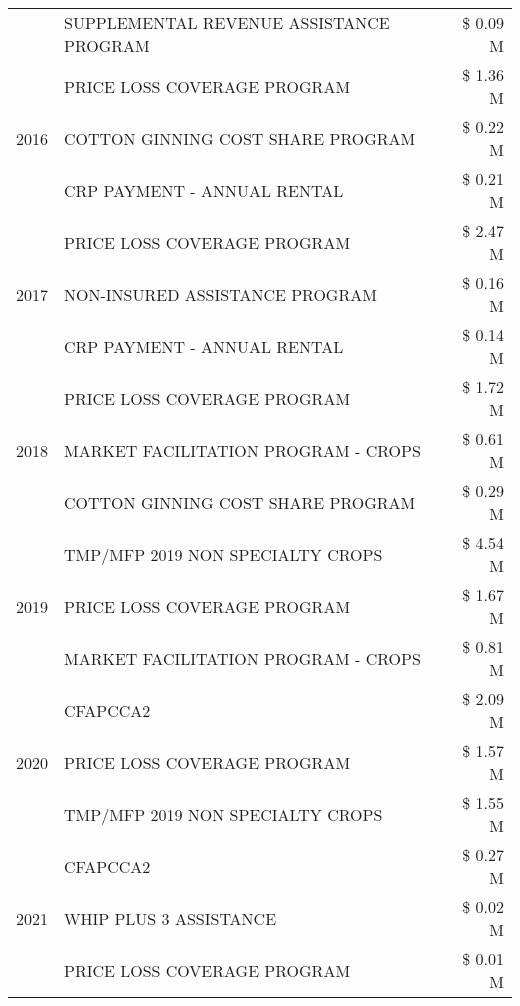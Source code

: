 \begin{tabular}{llr}
 & SUPPLEMENTAL REVENUE ASSISTANCE PROGRAM & \$ 0.09 M \\
\cline{1-3}
\multirow[t]{3}{*}{2016} & PRICE LOSS COVERAGE PROGRAM & \$ 1.36 M \\
 & COTTON GINNING COST SHARE PROGRAM & \$ 0.22 M \\
 & CRP PAYMENT - ANNUAL RENTAL & \$ 0.21 M \\
\cline{1-3}
\multirow[t]{3}{*}{2017} & PRICE LOSS COVERAGE PROGRAM & \$ 2.47 M \\
 & NON-INSURED ASSISTANCE PROGRAM & \$ 0.16 M \\
 & CRP PAYMENT - ANNUAL RENTAL & \$ 0.14 M \\
\cline{1-3}
\multirow[t]{3}{*}{2018} & PRICE LOSS COVERAGE PROGRAM & \$ 1.72 M \\
 & MARKET FACILITATION PROGRAM - CROPS & \$ 0.61 M \\
 & COTTON GINNING COST SHARE PROGRAM & \$ 0.29 M \\
\cline{1-3}
\multirow[t]{3}{*}{2019} & TMP/MFP 2019 NON SPECIALTY CROPS & \$ 4.54 M \\
 & PRICE LOSS COVERAGE PROGRAM & \$ 1.67 M \\
 & MARKET FACILITATION PROGRAM - CROPS & \$ 0.81 M \\
\cline{1-3}
\multirow[t]{3}{*}{2020} & CFAPCCA2 & \$ 2.09 M \\
 & PRICE LOSS COVERAGE PROGRAM & \$ 1.57 M \\
 & TMP/MFP 2019 NON SPECIALTY CROPS & \$ 1.55 M \\
\cline{1-3}
\multirow[t]{3}{*}{2021} & CFAPCCA2 & \$ 0.27 M \\
 & WHIP PLUS 3 ASSISTANCE & \$ 0.02 M \\
 & PRICE LOSS COVERAGE PROGRAM & \$ 0.01 M \\
\cline{1-3}
\bottomrule
\end{tabular}
